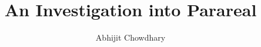 \documentclass[12pt]{article}
\begin{document}
 
\title{An Investigation into Parareal}
\author{Abhijit Chowdhary} 

\maketitle

\tableofcontents








\end{document}
